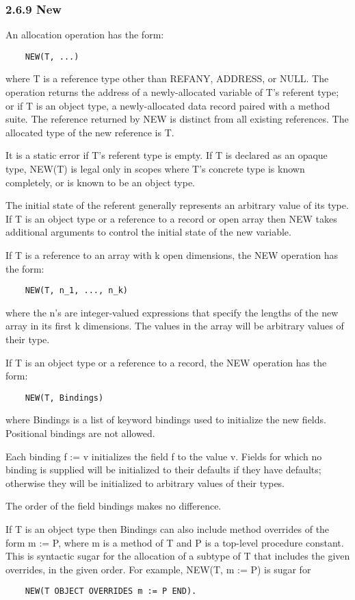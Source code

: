 \documentclass[10pt]{article}
\begin{document}
 
\subsubsection*{2.6.9 New}


  An allocation operation has the form: 
\begin{verbatim}
    NEW(T, ...)
\end{verbatim}
 where T is a reference type other than REFANY, ADDRESS, or NULL. The operation returns the address of a newly-allocated variable of T's referent type; or if T is an object type, a newly-allocated data record paired with a method suite. The reference returned by NEW is distinct from all existing references. The allocated type of the new reference is T. 


  It is a static error if T's referent type is empty. If T is declared as an opaque type, NEW(T) is legal only in scopes where T's concrete type is known completely, or is known to be an object type. 


  The initial state of the referent generally represents an arbitrary value of its type. If T is an object type or a reference to a record or open array then NEW takes additional arguments to control the initial state of the new variable. 


 If T is a reference to an array with k open dimensions, the NEW operation has the form: 
\begin{verbatim}
    NEW(T, n_1, ..., n_k)
\end{verbatim}
 where the n's are integer-valued expressions that specify the lengths of the new array in its first k dimensions. The values in the array will be arbitrary values of their type. 


 If T is an object type or a reference to a record, the NEW operation has the form: 
\begin{verbatim}
    NEW(T, Bindings)
\end{verbatim}
 where Bindings is a list of keyword bindings used to initialize the new fields. Positional bindings are not allowed. 


  Each binding f := v initializes the field f to the value v. Fields for which no binding is supplied will be initialized to their defaults if they have defaults; otherwise they will be initialized to arbitrary values of their types. 


  The order of the field bindings makes no difference. 


  If T is an object type then Bindings can also include method overrides of the form m := P, where m is a method of T and P is a top-level procedure constant. This is syntactic sugar for the allocation of a subtype of T that includes the given overrides, in the given order. For example, NEW(T, m := P) is sugar for 
\begin{verbatim}
    NEW(T OBJECT OVERRIDES m := P END).
\end{verbatim}
\end{document}
